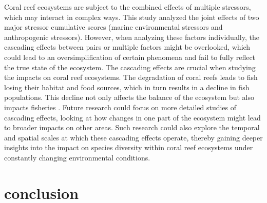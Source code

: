 \documentclass[a4paper, 11]{article}
\begin{document}
Coral reef ecosystems are subject to the combined effects of multiple stressors, which may interact in complex ways. This study analyzed the joint effects of two major stressor cumulative scores (marine environmental stressors and anthropogenic stressors). However, when analyzing these factors individually, the cascading effects between pairs or multiple factors might be overlooked, which could lead to an oversimplification of certain phenomena and fail to fully reflect the true state of the ecosystem. The cascading effects are crucial when studying the impacts on coral reef ecosystems. The degradation of coral reefs leads to fish losing their habitat and food sources, which in turn results in a decline in fish populations. This decline not only affects the balance of the ecosystem but also impacts fisheries \citep{hoegh2011impact}. Future research could focus on more detailed studies of cascading effects, looking at how changes in one part of the ecosystem might lead to broader impacts on other areas. Such research could also explore the temporal and spatial scales at which these cascading effects operate,  thereby gaining deeper insights into the impact on species diversity within coral reef ecosystems under constantly changing environmental conditions.


\section{conclusion}
\end{document}
